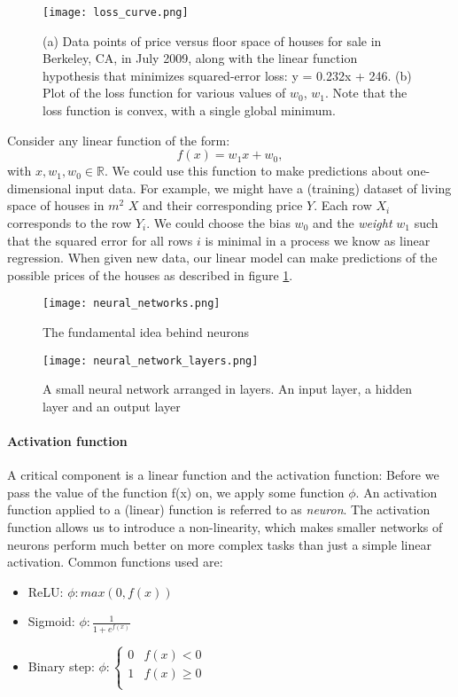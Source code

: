 \begin{figure}
    \centering
    \texttt{[image: loss\_curve.png]}
    \caption{(a) Data points of price versus floor space of houses for sale in Berkeley, CA, in July 2009, along with the linear function hypothesis that minimizes squared-error loss: y = 0.232x + 246. (b) Plot of the loss function for various values of $ w_0 $, $ w_1 $. Note that the loss function is convex, with a single global minimum. \cite[p. 1251]{russell_artificial_2021}}
    \label{loss_curve}
\end{figure}

Consider any linear function of the form:
$$
    f(x) = w_1x + w_0,
$$
with $ x, w_1, w_0 \in \mathbb{R} $. We could use this function to make predictions about one-dimensional input data. For example, we might have a (training) dataset of living space of houses in $ m^2 $ $ X $ and their corresponding price $ Y $. Each row $X_i$ corresponds to the row $Y_i$. We could choose the bias $ w_0 $ and the \textit{weight} $ w_1 $ such that the squared error for all rows $i$ is minimal in a process we know as linear regression. When given new data, our linear model can make predictions of the possible prices of the houses as described in figure \ref{loss_curve}.


\begin{figure}
    \centering
    \texttt{[image: neural\_networks.png]}
    \caption{The fundamental idea behind neurons}
    \label{neural_network}
\end{figure}

\begin{figure}
    \centering
    \texttt{[image: neural\_network\_layers.png]}
    \caption{A small neural network arranged in layers. An input layer, a hidden layer and an output layer}
    \label{neural_network_layers}
\end{figure}

\paragraph{Activation function}
A critical component is a linear function and the activation function: Before we pass the value of the function f(x) on, we apply some function $ \phi $. An activation function applied to a (linear) function is referred to as \textit{neuron}. The activation function allows us to introduce a non-linearity, which makes smaller networks of neurons perform much better on more complex tasks than just a simple linear activation. Common functions used are:
\begin{itemize}
    \item ReLU: $ \phi : max(0, f(x)) $
    \item Sigmoid: $ \phi : \frac{1}{1 + e^{f(x)}} $
    \item Binary step: $ \phi : \begin{cases}
                  0 & f(x) < 0    \\
                  1 & f(x) \geq 0 \\
              \end{cases}$
\end{itemize}

